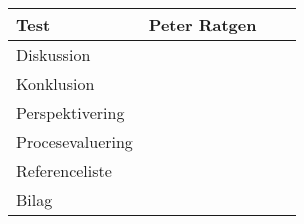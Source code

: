 \begin{table}[h!]
\begin{tabular}{|p{40mm}|p{25mm}|p{25mm}|p{25mm}|}
        Test                   & Peter Ratgen     &          &  \\ \hline
        Diskussion             &                  &          &  \\ \hline
        Konklusion             &                  &          &  \\ \hline
        Perspektivering        &                  &          &  \\ \hline
        Procesevaluering       &                  &          &  \\ \hline
        Referenceliste         &                  &          &  \\ \hline
        Bilag                  &                  &          &  \\ \hline
    \end{tabular}
\end{table}

\clearpage
